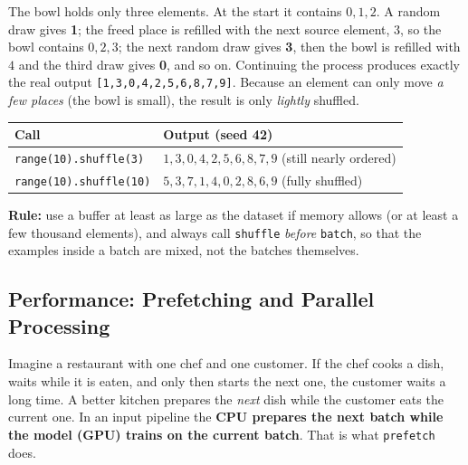 \begin{explain}
The bowl holds only three elements. At the start it contains $0,1,2$. A random draw gives \textbf{1}; the freed place is refilled with the next source element, $3$, so the bowl contains $0,2,3$; the next random draw gives \textbf{3}, then the bowl is refilled with $4$ and the third draw gives \textbf{0}, and so on. Continuing the process produces exactly the real output \texttt{[1,3,0,4,2,5,6,8,7,9]}. Because an element can only move \emph{a few places} (the bowl is small), the result is only \emph{lightly} shuffled.
\end{explain}

\begin{center}
\begin{tabular}{@{}lp{9cm}@{}}
\toprule
\textbf{Call} & \textbf{Output (seed 42)}\\
\midrule
\texttt{range(10).shuffle(3)} & $1,3,0,4,2,5,6,8,7,9$ (still nearly ordered)\\
\texttt{range(10).shuffle(10)} & $5,3,7,1,4,0,2,8,6,9$ (fully shuffled)\\
\bottomrule
\end{tabular}
\end{center}

\begin{keyidea}
\textbf{Rule:} use a buffer at least as large as the dataset if memory allows (or at least a few thousand elements), and always call \texttt{shuffle} \emph{before} \texttt{batch}, so that the examples inside a batch are mixed, not the batches themselves.
\end{keyidea}

\subsection{Performance: Prefetching and Parallel Processing}

Imagine a restaurant with one chef and one customer. If the chef cooks a dish, waits while it is eaten, and only then starts the next one, the customer waits a long time. A better kitchen prepares the \emph{next} dish while the customer eats the current one. In an input pipeline the \textbf{CPU prepares the next batch while the model (GPU) trains on the current batch}. That is what \texttt{prefetch} does.

